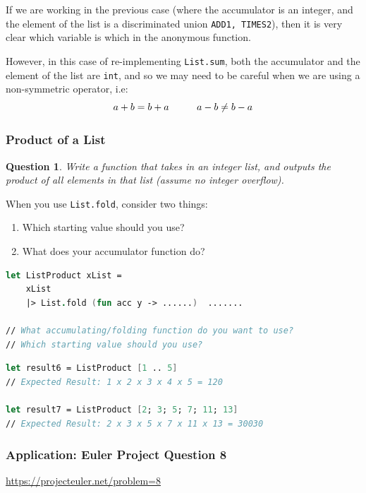 \documentclass[12pt]{article}
\newtheorem*{question*}{Question}
\begin{document}
If we are working in the previous case (where the accumulator is an integer, and the element of the list is a discriminated union \texttt{ADD1, TIMES2}), then it is very clear which variable is which in the anonymous function.

However, in this case of re-implementing \texttt{List.sum}, both the accumulator and the element of the list are \texttt{int}, and so we may need to be careful when we are using a non-symmetric operator, i.e:
\[
a + b =  b + a \hspace{1.0cm} a - b \neq b - a
\]

\pagebreak
\subsubsection*{Product of a List}
\begin{question*}
Write a function that takes in an integer list, and outputs the product of all elements in that list (assume no integer overflow).
\end{question*}
When you use \texttt{List.fold}, consider two things:
\begin{enumerate}
\item Which starting value should you use?
\item What does your accumulator function do? 
\end{enumerate}
\begin{lstlisting}[language=FSharp]
let ListProduct xList =
    xList
    |> List.fold (fun acc y -> ......)  .......

// What accumulating/folding function do you want to use?
// Which starting value should you use?
\end{lstlisting}
\begin{lstlisting}[language=FSharp]
let result6 = ListProduct [1 .. 5]
// Expected Result: 1 x 2 x 3 x 4 x 5 = 120

let result7 = ListProduct [2; 3; 5; 7; 11; 13]
// Expected Result: 2 x 3 x 5 x 7 x 11 x 13 = 30030
\end{lstlisting}

\vfill

\pagebreak

\subsubsection*{Application: Euler Project Question 8}

\url{https://projecteuler.net/problem=8}
\end{document}
